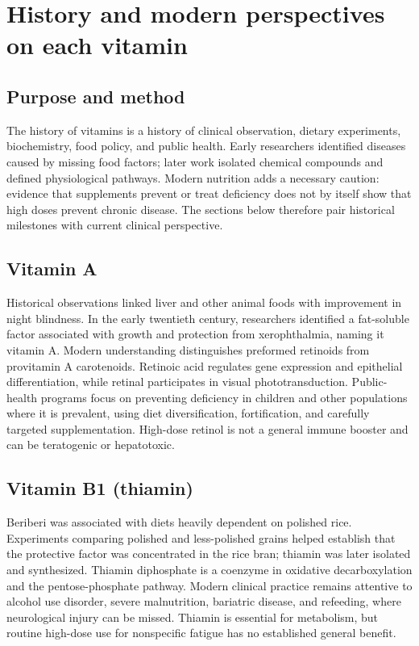 \chapter{History and modern perspectives on each vitamin}

\section{Purpose and method}
The history of vitamins is a history of clinical observation, dietary experiments, biochemistry, food policy, and public health. Early researchers identified diseases caused by missing food factors; later work isolated chemical compounds and defined physiological pathways. Modern nutrition adds a necessary caution: evidence that supplements prevent or treat deficiency does not by itself show that high doses prevent chronic disease. The sections below therefore pair historical milestones with current clinical perspective. \cite{historyNutrition,uspstfSupplements}

\section{Vitamin A}
Historical observations linked liver and other animal foods with improvement in night blindness. In the early twentieth century, researchers identified a fat-soluble factor associated with growth and protection from xerophthalmia, naming it vitamin A. Modern understanding distinguishes preformed retinoids from provitamin A carotenoids. Retinoic acid regulates gene expression and epithelial differentiation, while retinal participates in visual phototransduction. Public-health programs focus on preventing deficiency in children and other populations where it is prevalent, using diet diversification, fortification, and carefully targeted supplementation. High-dose retinol is not a general immune booster and can be teratogenic or hepatotoxic. \cite{historyVitaminA,odsA}

\section{Vitamin B1 (thiamin)}
Beriberi was associated with diets heavily dependent on polished rice. Experiments comparing polished and less-polished grains helped establish that the protective factor was concentrated in the rice bran; thiamin was later isolated and synthesized. Thiamin diphosphate is a coenzyme in oxidative decarboxylation and the pentose-phosphate pathway. Modern clinical practice remains attentive to alcohol use disorder, severe malnutrition, bariatric disease, and refeeding, where neurological injury can be missed. Thiamin is essential for metabolism, but routine high-dose use for nonspecific fatigue has no established general benefit. \cite{historyNutrition,odsThiamin}

